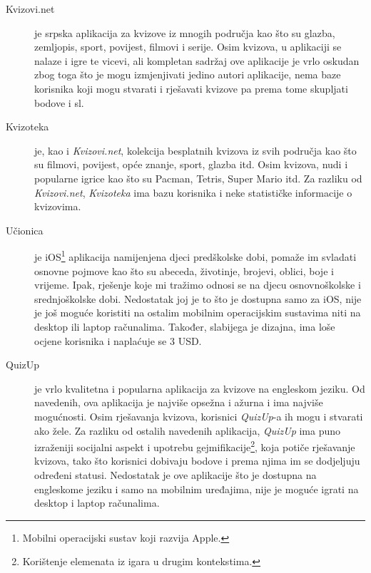 \documentclass[11pt]{scrreprt}
\begin{document}
\begin{description}

  \item[Kvizovi.net] je srpska aplikacija za kvizove iz mnogih područja kao što
    su glazba, zemljopis, sport, povijest, filmovi i serije. Osim kvizova, u
    aplikaciji se nalaze i igre te vicevi, ali kompletan sadržaj ove aplikacije
    je vrlo oskudan zbog toga što je mogu izmjenjivati jedino autori
    aplikacije, nema baze korisnika koji mogu stvarati i rješavati kvizove pa
    prema tome skupljati bodove i sl.\cite{kvizovinet}

  \item[Kvizoteka] je, kao i \emph{Kvizovi.net}, kolekcija besplatnih kvizova iz
    svih područja kao što su filmovi, povijest, opće znanje, sport, glazba itd.
    Osim kvizova, nudi i popularne igrice kao što su Pacman, Tetris, Super Mario
    itd. Za razliku od \emph{Kvizovi.net}, \emph{Kvizoteka} ima bazu korisnika i
    neke statističke informacije o kvizovima.\cite{kvizoteka}

  \item[Učionica] je iOS\footnote{Mobilni operacijski sustav koji razvija
    Apple.} aplikacija namijenjena djeci predškolske dobi, pomaže im svladati
    osnovne pojmove kao što su abeceda, životinje, brojevi, oblici, boje i
    vrijeme. Ipak, rješenje koje mi tražimo odnosi se na djecu osnovnoškolske i
    srednjoškolske dobi. Nedostatak joj je to što je dostupna samo za iOS, nije
    je još moguće koristiti na ostalim mobilnim operacijskim sustavima niti na
    desktop ili laptop računalima. Također, slabijega je dizajna, ima loše
    ocjene korisnika i naplaćuje se 3 USD.\cite{ucionica}

  \item[QuizUp] je vrlo kvalitetna i popularna aplikacija za kvizove na
    engleskom jeziku. Od navedenih, ova aplikacija je najviše opsežna i ažurna i
    ima najviše mogućnosti. Osim rješavanja kvizova, korisnici \emph{QuizUp}-a
    ih mogu i stvarati ako žele. Za razliku od ostalih navedenih aplikacija,
    \emph{QuizUp} ima puno izraženiji socijalni aspekt i upotrebu
    gejmifikacije\footnote{Korištenje elemenata iz igara u drugim kontekstima.},
    koja potiče rješavanje kvizova, tako što korisnici dobivaju bodove i prema
    njima im se dodjeljuju određeni statusi. Nedostatak je ove aplikacije što
    je dostupna na engleskome jeziku i samo na mobilnim uređajima, nije je
    moguće igrati na desktop i laptop računalima.\cite{quizup}

\end{description}
\end{document}
